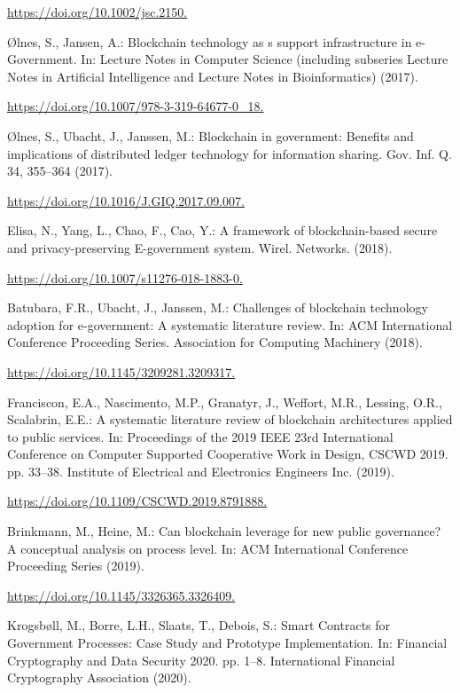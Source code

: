 \begin{multicols}{2}
\begin{thebibliography}{99}
\url{https://doi.org/10.1002/jsc.2150.}

 Ølnes, S., Jansen, A.: Blockchain technology as s support infrastructure in e-Government. In: Lecture Notes in Computer Science (including subseries Lecture Notes in Artificial Intelligence and Lecture Notes in Bioinformatics) (2017). 

\url{https://doi.org/10.1007/978-3-319-64677-0_18.}

 Ølnes, S., Ubacht, J., Janssen, M.: Blockchain in government: Benefits and implications of distributed ledger technology for information sharing. Gov. Inf. Q. 34, 355–364 (2017).

\url{https://doi.org/10.1016/J.GIQ.2017.09.007.}

	Elisa, N., Yang, L., Chao, F., Cao, Y.: A framework of blockchain-based secure and privacy-preserving E-government system. Wirel. Networks. (2018).
 
\url{https://doi.org/10.1007/s11276-018-1883-0.}

	Batubara, F.R., Ubacht, J., Janssen, M.: Challenges of blockchain technology adoption for e-government: A systematic literature review. In: ACM International Conference Proceeding Series. Association for Computing Machinery (2018).
 
\url{https://doi.org/10.1145/3209281.3209317.}

 Franciscon, E.A., Nascimento, M.P., Granatyr, J., Weffort, M.R., Lessing, O.R., Scalabrin, E.E.: A systematic literature review of blockchain architectures applied to public services. In: Proceedings of the 2019 IEEE 23rd International Conference on Computer Supported Cooperative Work in Design, CSCWD 2019. pp. 33–38. Institute of Electrical and Electronics Engineers Inc. (2019).

\url{https://doi.org/10.1109/CSCWD.2019.8791888.}
 
 Brinkmann, M., Heine, M.: Can blockchain leverage for new public governance? A conceptual analysis on process level. In: ACM International Conference Proceeding Series (2019).

\url{https://doi.org/10.1145/3326365.3326409.}

 Krogsbøll, M., Borre, L.H., Slaats, T., Debois, S.: Smart Contracts for Government Processes: Case Study and Prototype Implementation. In: Financial Cryptography and Data Security 2020. pp. 1–8. International Financial Cryptography Association (2020).


\end{thebibliography}
\end{multicols}
